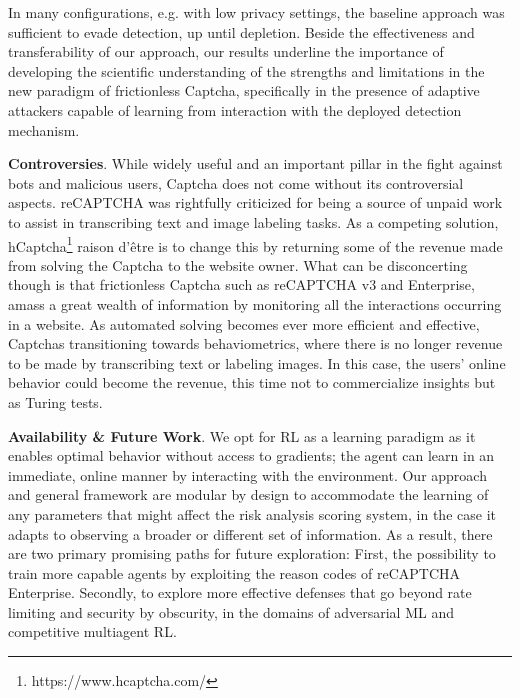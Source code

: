 In many configurations, e.g. with low privacy settings, the baseline approach was sufficient to evade detection, up until depletion.
Beside the effectiveness and transferability of our approach, our results underline the importance of developing the scientific understanding of the strengths and limitations in the new paradigm of frictionless Captcha, specifically in the presence of adaptive attackers capable of learning from interaction with the deployed detection mechanism.

\textbf{Controversies}. While widely useful and an important pillar in the fight against bots and malicious users, Captcha does not come without its controversial aspects.
reCAPTCHA was rightfully criticized for being a source of unpaid work to assist in transcribing text and image labeling tasks.
As a competing solution, hCaptcha\footnote{https://www.hcaptcha.com/} raison d'être is to change this by returning some of the revenue made from solving the Captcha to the website owner.
What can be disconcerting though is that frictionless Captcha such as reCAPTCHA v3 and Enterprise, amass a great wealth of information by monitoring all the interactions occurring in a website.
As automated solving becomes ever more efficient and effective, Captchas transitioning towards behaviometrics, where there is no longer revenue to be made by transcribing text or labeling images.
In this case, the users' online behavior could become the revenue, this time not to commercialize insights but as Turing tests.

\textbf{Availability \& Future Work}.
We opt for \gls{RL} as a learning paradigm as it enables optimal behavior without access to gradients; the agent can learn in an immediate, online manner by interacting with the environment.
Our approach and general framework are modular by design to accommodate the learning of any parameters that might affect the risk analysis scoring system, in the case it adapts to observing a broader or different set of information.
As a result, there are two primary promising paths for future exploration:
First, the possibility to train more capable agents by exploiting the reason codes of reCAPTCHA Enterprise.
Secondly, to explore more effective defenses that go beyond rate limiting and security by obscurity, in the domains of adversarial \gls{ML} and competitive multiagent \gls{RL}.

